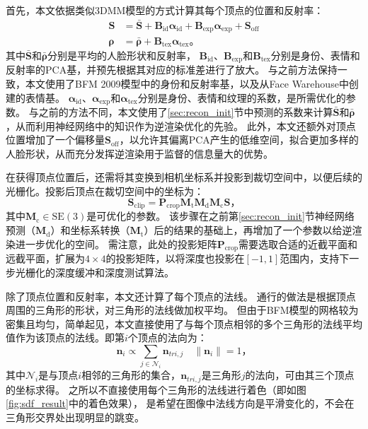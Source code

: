 首先，本文依据类似3DMM模型的方式计算其每个顶点的位置和反射率：
\begin{align}
\mathbf{S} &= \bar{\mathbf{S}} +
\mathbf{B}_\mathrm{id}\mathbf{\alpha}_\mathrm{id} +
\mathbf{B}_\mathrm{exp}\mathbf{\alpha}_\mathrm{exp} +
\mathbf{S}_\mathrm{off}\\
\mathbf{\rho} &= \bar{\mathbf{\rho}} +
\mathbf{B}_\mathrm{tex}\mathbf{\alpha}_\mathrm{tex}
\text{。}
\end{align}
其中$\bar{\mathbf{S}}$和$\bar{\mathbf{\rho}}$分别是平均的人脸形状和反射率，
$\mathbf{B}_\mathrm{id}$、$\mathbf{B}_\mathrm{exp}$和$\mathbf{B}_\mathrm{tex}$分别是身份、表情和反射率的PCA基，并预先根据其对应的标准差进行了放大。
与之前方法\citep{deep3d,GuoZCJZ19}保持一致，本文使用了BFM 2009模型\citep{BFM}中的身份和反射率基，以及从Face Warehouse\citep{FaceWarehouse}中创建的表情基。
$\mathbf{\alpha}_\mathrm{id}$、$\mathbf{\alpha}_\mathrm{exp}$和$\mathbf{\alpha}_\mathrm{tex}$分别是身份、表情和纹理的系数，是所需优化的参数。
与之前的方法不同，本文使用了\ref{sec:recon_init}节中预测的系数来计算$\bar{\mathbf{S}}$和$\bar{\mathbf{\rho}}$，从而利用神经网络中的知识作为逆渲染优化的先验。
此外，本文还额外对顶点位置增加了一个偏移量$\mathbf{S}_\mathrm{off}$，以允许其偏离PCA产生的低维空间，拟合更加多样的人脸形状，从而充分发挥逆渲染用于监督的信息量大的优势。

在获得顶点位置后，还需将其变换到相机坐标系并投影到裁切空间中，以便后续的光栅化。投影后顶点在裁切空间中的坐标为：
\begin{equation}
\mathbf{S}_\mathrm{clip} = \mathbf{P}_\mathrm{crop}\mathbf{M}_\mathrm{t}\mathbf{M}_\mathrm{d}\mathbf{M}_\mathrm{c}\mathbf{S}
\text{，}
\end{equation}
其中$\mathbf{M}_\mathrm{c}\in \mathrm{SE(3)}$是可优化的参数。
该步骤在之前第\ref{sec:recon_init}节神经网络预测（$\mathbf{M}_\mathrm{d}$）和坐标系转换（$\mathbf{M}_\mathrm{t}$）后的结果的基础上，再增加了一个参数以给逆渲染进一步优化的空间。
需注意，此处的投影矩阵$\mathbf{P}_\mathrm{crop}$需要选取合适的近截平面和远截平面，扩展为$4\times 4$的投影矩阵，以将深度也投影在$[-1,1]$范围内，支持下一步光栅化的深度缓冲和深度测试算法。

除了顶点位置和反射率，本文还计算了每个顶点的法线。
通行的做法是根据顶点周围的三角形的形状，对三角形的法线做加权平均。
但由于BFM模型的网格较为密集且均匀，简单起见，本文直接使用了与每个顶点相邻的多个三角形的法线平均值作为该顶点的法线。即第$i$个顶点的法向为：
\begin{equation}
\mathbf{n}_i \propto \sum_{j\in\mathcal{N}_i}\mathbf{n}_{tri,j} \quad
\|\mathbf{n}_i\| = 1
\text{，}
\end{equation}
其中$\mathcal{N}_i$是与顶点$i$相邻的三角形的集合，$\mathbf{n}_{tri,j}$是三角形$j$的法向，可由其三个顶点的坐标求得。
之所以不直接使用每个三角形的法线进行着色（即如图\ref{fig:sdf_result}中的着色效果），
是希望在图像中法线方向是平滑变化的，不会在三角形交界处出现明显的跳变。

